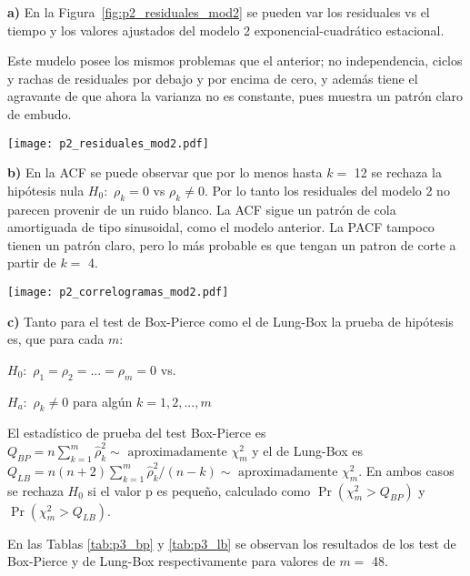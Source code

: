 \documentclass{tufte-handout}
\begin{document}
\textbf{a)} En la Figura~\ref{fig:p2_residuales_mod2} se pueden var los residuales vs el tiempo y los valores ajustados del modelo 2 exponencial-cuadrático estacional.

Este mudelo posee los mismos problemas que el anterior; no independencia, ciclos y rachas de residuales por debajo y por encima de cero, y además tiene el agravante de que ahora la varianza no es constante, pues muestra un patrón claro de embudo.

\begin{figure*}
	\texttt{[image: p2\_residuales\_mod2.pdf]}
	\caption{Gráficos de residuales modelo 2 exponencial-cuadrático estacional.}
	\label{fig:p2_residuales_mod2}
\end{figure*}

\textbf{b)} En la ACF se puede observar que por lo menos hasta $k=$ 12 se rechaza la hipótesis nula $H_0:$ $\rho_k = 0$ vs  $\rho_k \neq 0$. Por lo tanto los residuales del modelo 2 no parecen provenir de un ruido blanco. La ACF sigue un patrón de cola amortiguada de tipo sinusoidal, como el modelo anterior. La PACF tampoco tienen un patrón claro, pero lo más probable es que tengan un patron de corte a partir de $k=$ 4.

\begin{figure*}
	\texttt{[image: p2\_correlogramas\_mod2.pdf]}
	\caption{Correlogramas de los residuales modelo 2 exponencial-cuadrático estacional.}
	\label{fig:p2_correlogramas_mod2}
\end{figure*}

\textbf{c)} Tanto para el test de Box-Pierce como el de Lung-Box la prueba de hipótesis es, que para cada $m$:

$H_0:$ $\rho_1=\rho_2=...=\rho_m=0$ vs.

$H_a:$ $\rho_k \neq 0$ para algún $k=1,2,...,m$

El estadístico de prueba del test Box-Pierce es $Q_{BP}=n \sum_{k=1}^m \hat{\rho}_k^2 \sim \text{ aproximadamente } \chi_m^2$ y el de Lung-Box es $Q_{LB}=n(n+2) \sum_{k=1}^m \hat{\rho}_k^2/(n-k) \sim \text{ aproximadamente } \chi_m^2$. En ambos casos se rechaza $H_0$ si el valor p es pequeño, calculado como $\Pr(\chi_m^2 >Q_{BP})$ y $\Pr(\chi_m^2 >Q_{LB})$.

En las Tablas \ref{tab:p3_bp} y \ref{tab:p3_lb} se observan los resultados de los test de Box-Pierce y de Lung-Box respectivamente para valores de $m=$ 48.
\end{document}
